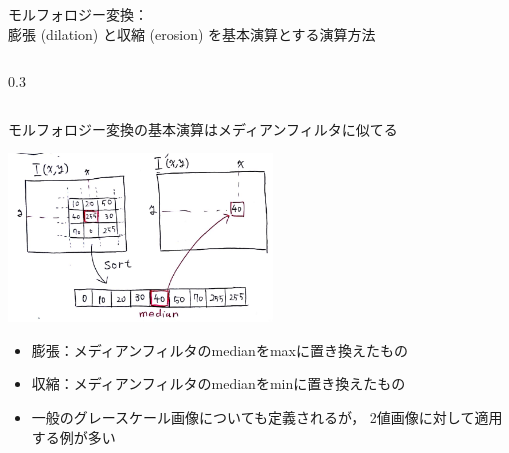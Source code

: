 \documentclass[10pt]{beamer}
\begin{document}
\begin{frame}{モルフォロジー変換：\\膨張 (dilation) と収縮 (erosion) を基本演算とする演算方法}
\begin{columns}
\begin{column}[c]{0.3\hsize}
	        \end{column}
	    \end{columns}
	\end{frame}
	
	\begin{frame}{モルフォロジー変換の基本演算はメディアンフィルタに似てる}
	    \begin{center}
	        \includegraphics[width=7.0cm]{figs/median_filter.png}
	    \end{center}
	    \begin{itemize}
	        \item 膨張：メディアンフィルタのmedianをmaxに置き換えたもの
	        \item 収縮：メディアンフィルタのmedianをminに置き換えたもの
	        \item 一般のグレースケール画像についても定義されるが，
	            2値画像に対して適用する例が多い
	    \end{itemize}
	\end{frame}
	
\end{document}

